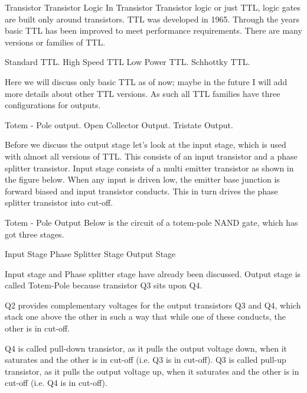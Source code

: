    Transistor Transistor Logic
  In Transistor Transistor logic or just TTL, logic gates are built only around transistors. TTL was developed in 1965. Through the years basic TTL has been improved to meet performance requirements. There are many versions or families of TTL.



  Standard TTL.
High Speed TTL
Low Power TTL.
Schhottky TTL.



  Here we will discuss only basic TTL as of now; maybe in the future I will add more details about other TTL versions. As such all TTL families have three configurations for outputs.



  Totem - Pole output.
Open Collector Output.
Tristate Output.



  Before we discuss the output stage let's look at the input stage, which is used with almost all versions of TTL. This consists of an input transistor and a phase splitter transistor. Input stage consists of a multi emitter transistor as shown in the figure below. When any input is driven low, the emitter base junction is forward biased and input transistor conducts. This in turn drives the phase splitter transistor into cut-off.






   Totem - Pole Output
  Below is the circuit of a totem-pole NAND gate, which has got three stages.



  Input Stage
Phase Splitter Stage
Output Stage



  Input stage and Phase splitter stage have already been discussed. Output stage is called Totem-Pole because transistor Q3 sits upon Q4.



  Q2 provides complementary voltages for the output transistors Q3 and Q4, which stack one above the other in such a way that while one of these conducts, the other is in cut-off.



  Q4 is called pull-down transistor, as it pulls the output voltage down, when it saturates and the other is in cut-off (i.e. Q3 is in cut-off). Q3 is called pull-up transistor, as it pulls the output voltage up, when it saturates and the other is in cut-off (i.e. Q4 is in cut-off).



